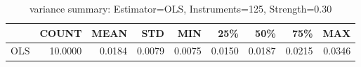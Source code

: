 \begin{table}[ht]
\centering
\caption{variance summary: Estimator=OLS, Instruments=125, Strength=0.30}
\begin{tabular}{lrrrrrrrr}
\toprule
 & COUNT & MEAN & STD & MIN & 25\% & 50\% & 75\% & MAX \\
\midrule
OLS & 10.0000 & 0.0184 & 0.0079 & 0.0075 & 0.0150 & 0.0187 & 0.0215 & 0.0346 \\
\bottomrule
\end{tabular}
\end{table}
